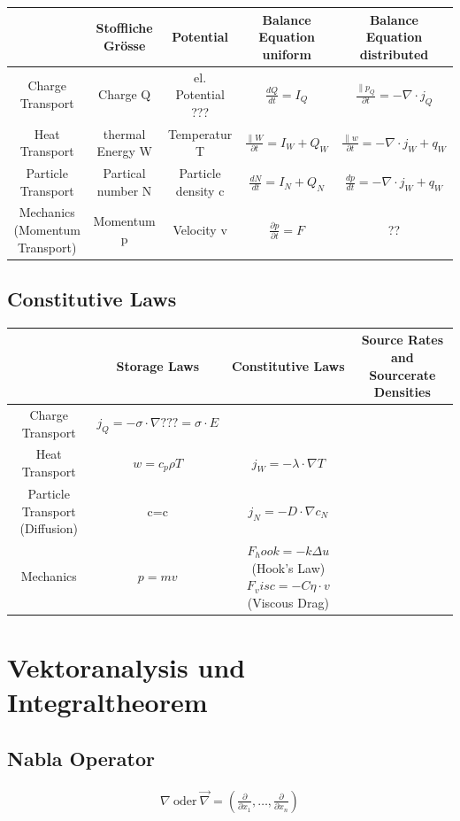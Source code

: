 \documentclass[a4paper]{scrartcl}
\begin{document}
\begin{tabular}{|c|c|c|c|c|}
\hline  & Stoffliche Grösse & Potential & Balance Equation uniform & Balance Equation distributed \\ 
\hline Charge Transport & Charge Q & el. Potential ??? & $\frac{dQ}{dt}=I_Q$ & $ \frac{\parallel p_Q}{\partial t}=-\nabla\cdot j_Q$ \\ 
\hline Heat Transport & thermal Energy W & Temperatur T & $\frac{\parallel W}{\partial t}= I_W+Q_W$ & $\frac{\parallel w}{\partial t}= -\nabla \cdot j_W+q_W$  \\ 
\hline Particle Transport & Partical number N & Particle density c & $\frac{dN}{dt}=I_N+Q_N$ & $\frac{dp}{dt}=-\nabla \cdot j_W +q_W$ \\ 
\hline Mechanics (Momentum Transport) & Momentum p & Velocity v  & $\frac{\partial p}{\partial t}=F$ & ?? \\ 
\hline 
\end{tabular} 

\subsection{Constitutive Laws}

\begin{tabular}{|c|c|c|c|}
\hline  & Storage Laws & Constitutive Laws & Source Rates and Sourcerate Densities \\
\hline Charge Transport & $j_Q=-\sigma \cdot \nabla ??? = \sigma \cdot E$ & & \\
 
\hline Heat Transport & $w=c_p \rho T$ & $j_W=-\lambda \cdot \nabla T$ &  \\ 
\hline Particle Transport (Diffusion) & c=c & $j_N=- D \cdot \nabla c_N$ &  \\ 
\hline Mechanics & $p=mv$ & $F_hook = - k \Delta u$ (Hook's Law) $F_visc=-C \eta \cdot v$ (Viscous Drag) &  \\ 
\hline 
\end{tabular} 




\section{Vektoranalysis und Integraltheorem}
\subsection{Nabla Operator}

\begin{align}
\nabla \: \mathrm{oder} \: \vec \nabla = \left (\frac\partial{\partial
x_1},\ldots, \frac\partial{\partial x_n}\right)
\end{align}
\end{document}
